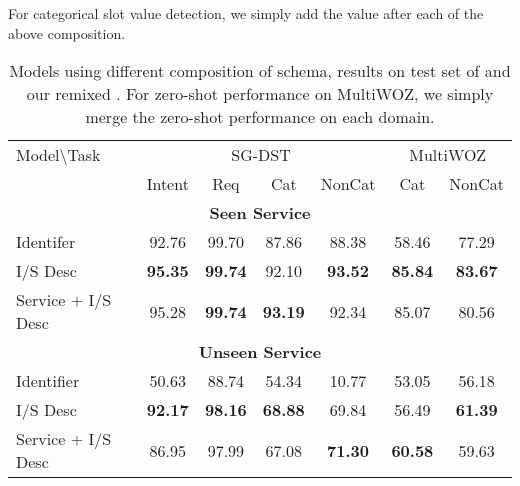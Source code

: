 For categorical slot value detection, we simply add the
value after each of the above composition.

\begin{table}[!t]
  \caption{\label{tbl:schema-component-results} Models using different
    composition of schema, results on test set of \sgdst and our
    remixed \multiwoz. For zero-shot performance on MultiWOZ, we
    simply merge the zero-shot performance on each domain.}
\begin{center}
\setlength{\tabcolsep}{2pt}
\begin{tabular}{l|cccc|cc}
\toprule
\hline
Model\textbackslash{Task} & \multicolumn{4}{c|}{SG-DST} & \multicolumn{2}{c}{MultiWOZ}                                        \\
                          & Intent                      & Req         & Cat         & NonCat      & Cat         & NonCat      \\ \hline
  \multicolumn{7}{c}{{\bf Seen Service}}                                                                                      \\ \hline
Identifer                 & 92.76                       & 99.70       & 87.86       & 88.38       & 58.46       & 77.29       \\
I/S Desc                  & {\bf 95.35}                 & {\bf 99.74} & 92.10       & {\bf 93.52} & {\bf 85.84} & {\bf 83.67} \\
Service + I/S Desc        & 95.28                       & {\bf 99.74} & {\bf 93.19} & 92.34       & 85.07       & 80.56       \\ \hline
  \multicolumn{7}{c}{{\bf Unseen Service}}                                                                                    \\ \hline
Identifier                & 50.63                       & 88.74       & 54.34       & 10.77       & 53.05       & 56.18       \\
I/S Desc                  & {\bf 92.17}                 & {\bf 98.16} & {\bf 68.88} & 69.84       & 56.49       & {\bf 61.39} \\
Service + I/S Desc        & 86.95                       & 97.99       & 67.08       & {\bf 71.30} & {\bf 60.58} & 59.63       \\
\hline
\bottomrule
\end{tabular}
\end{center}
\end{table}
